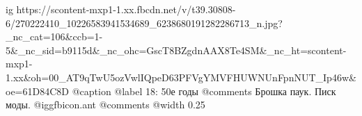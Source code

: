  
 
 
 
 

\ifcmt
  ig https://scontent-mxp1-1.xx.fbcdn.net/v/t39.30808-6/270222410_10226583941534689_6238680191282286713_n.jpg?_nc_cat=106&ccb=1-5&_nc_sid=b9115d&_nc_ohc=GscT8BZgdnAAX8Te4SM&_nc_ht=scontent-mxp1-1.xx&oh=00_AT9qTwU5ozVwlIQpeD63PFVgYMVFHUWNUnFpnNUT_Ip46w&oe=61D84C8D
	@caption @label 18: 50е годы
	@comments%
Брошка паук. Писк моды.  @igg{fbicon.ant} 
	@comments%
  @width 0.25
\fi
